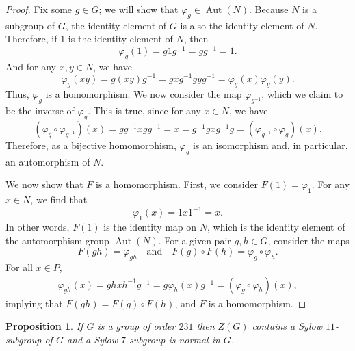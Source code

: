 \documentclass[12pt]{article}
\newtheorem{proposition}{Proposition}
\newcommand{\isp}[1]{\quad\text{#1}\quad}
\renewcommand{\phi}{\varphi}
\newcommand{\<}{\left\langle}
\renewcommand{\>}{\right\rangle}
\newcommand{\Aut}{\operatorname{Aut}}
\begin{document}
\begin{proof}
    Fix some $g \in G$; we will show that $\phi_g \in \Aut(N)$. Because $N$ is a subgroup of $G$, the identity element of $G$ is also the identity element of $N$. Therefore, if $1$ is the identity element of $N$, then
    \[
        \phi_g(1) = g1g^{-1} = gg^{-1} = 1.
    \]
    And for any $x, y \in N$, we have
    \[
        \phi_g(xy) = g(xy)g^{-1} = gxg^{-1}gyg^{-1} = \phi_g(x)\phi_g(y).
    \]
    Thus, $\phi_g$ is a homomorphism. We now consider the map $\phi_{g^{-1}}$, which we claim to be the inverse of $\phi_g$. This is true, since for any $x \in N$, we have
    \[
        (\phi_g \circ \phi_{g^{-1}})(x) = gg^{-1}xgg^{-1} = x = g^{-1}gxg^{-1}g = (\phi_{g^{-1}} \circ \phi_g)(x).
    \]
    Therefore, as a bijective homomorphism, $\phi_g$ is an isomorphism and, in particular, an automorphism of $N$.
    
    We now show that $F$ is a homomorphism. First, we consider $F(1) = \phi_1$. For any $x \in N$, we find that
    \[
        \phi_1(x) = 1x1^{-1} = x.
    \]
    In other words, $F(1)$ is the identity map on $N$, which is the identity element of the automorphism group $\Aut(N)$. For a given pair $g, h \in G$, consider the maps
    \[
        F(gh) = \phi_{gh} \isp{and} F(g) \circ F(h) = \phi_g \circ \phi_h.
    \]
    For all $x \in P$,
    \begin{align*}
        \phi_{gh}(x) = ghxh^{-1}g^{-1} = g\phi_h(x)g^{-1} = (\phi_g \circ \phi_h)(x),
    \end{align*}
    implying that $F(gh) = F(g) \circ F(h)$, and $F$ is a homomorphism.
    
\end{proof}

\newpage
\begin{proposition}
    If $G$ is a group of order $231$ then $Z(G)$ contains a Sylow $11$-subgroup of $G$ and a Sylow $7$-subgroup is normal in $G$.
\end{proposition}
\end{document}
